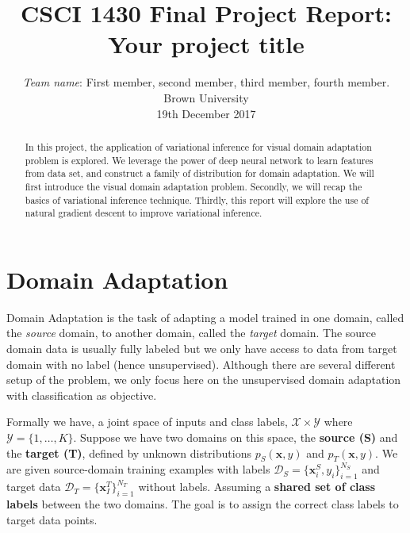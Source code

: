 \documentclass[10pt,twocolumn,letterpaper]{article}
\newcommand{\vect}[1]{\boldsymbol{\mathbf{#1}}}
\begin{document}
\title{CSCI 1430 Final Project Report:\\Your project title}

\author{\emph{Team name}: First member, second member, third member, fourth member.\\
Brown University\\
19th December 2017
}

\maketitle

\begin{abstract}
In this project, the application of variational inference for visual domain adaptation problem is explored. We leverage the power of deep neural network to learn features from data set, and construct a family of distribution for domain adaptation. We will first introduce the visual domain adaptation problem. Secondly, we will recap the basics of variational inference technique. Thirdly, this report will explore the use of natural gradient descent to improve variational inference.
\end{abstract}

\section{Domain Adaptation}

Domain Adaptation is the task of adapting a model trained in one domain, called the \textit{source} domain, to another domain, called the \textit{target} domain. The source domain data is usually fully labeled but we only have access to data from target domain with no label (hence unsupervised).
Although there are several different setup of the problem, we only focus here on the unsupervised domain adaptation with classification as objective.

Formally we have, a joint space of inputs and class labels, \(\mathcal{X} \times \mathcal{Y}\) where \(\mathcal{Y} = \{1,\dots,K\}\). 
Suppose we have two domains on this space, the \textbf{source (S)} and the \textbf{target (T)}, defined by unknown distributions 
\(p_S(\vect{x}, y)\) 
and 
\(p_T(\vect{x},y)\).
We are given source-domain training examples with labels \(\mathcal{D}_S = \{\vect{x}_i^S, y_i\}_{i=1}^{N_S}\) and target data \(\mathcal{D}_T = \{\vect{x}_I^T\}_{i=1}^{N_T}\) without labels.
Assuming a \textbf{shared set of class labels} between the two domains. The goal is to assign the correct class labels to target data points.
\end{document}
